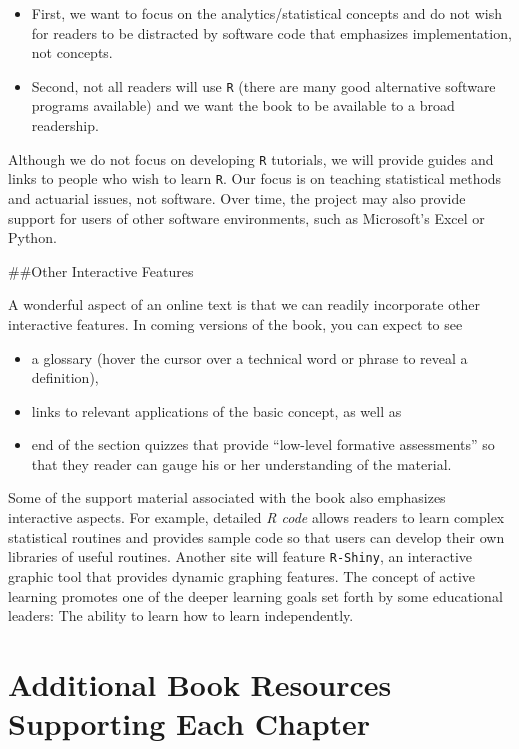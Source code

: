 \documentclass[
]{book}
\providecommand{\tightlist}{%
  \setlength{\itemsep}{0pt}\setlength{\parskip}{0pt}}
\begin{document}
\begin{itemize}
\tightlist
\item
  First, we want to focus on the analytics/statistical concepts and do not wish for readers to be distracted by software code that emphasizes implementation, not concepts.
\item
  Second, not all readers will use \texttt{R} (there are many good alternative software programs available) and we want the book to be available to a broad readership.
\end{itemize}

Although we do not focus on developing \texttt{R} tutorials, we will provide guides and links to people who wish to learn \texttt{R}. Our focus is on teaching statistical methods and actuarial issues, not software. Over time, the project may also provide support for users of other software environments, such as Microsoft's Excel or Python.

\#\#Other Interactive Features

A wonderful aspect of an online text is that we can readily incorporate other interactive features. In coming versions of the book, you can expect to see

\begin{itemize}
\tightlist
\item
  a glossary (hover the cursor over a technical word or phrase to reveal a definition),
\item
  links to relevant applications of the basic concept, as well as
\item
  end of the section quizzes that provide ``low-level formative assessments'' so that they reader can gauge his or her understanding of the material.
\end{itemize}

Some of the support material associated with the book also emphasizes interactive aspects. For example, detailed \emph{R code} allows readers to learn complex statistical routines and provides sample code so that users can develop their own libraries of useful routines. Another site will feature \texttt{R-Shiny}, an interactive graphic tool that provides dynamic graphing features. The concept of active learning promotes one of the deeper learning goals set forth by some educational leaders: The ability to learn how to learn independently.

\hypertarget{additional-book-resources-supporting-each-chapter}{%
\section{Additional Book Resources Supporting Each Chapter}\label{additional-book-resources-supporting-each-chapter}}
\end{document}
